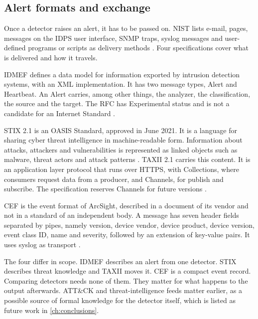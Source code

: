\subsection{Alert formats and exchange}
\label{sec:alert-formats}

Once a detector raises an alert, it has to be passed on. NIST lists e-mail,
pages, messages on the IDPS user interface, SNMP traps, syslog messages and
user-defined programs or scripts as delivery methods
\citep{scarfone2007nist80094}. Four specifications cover what is delivered
and how it travels.

IDMEF defines a data model for information exported by intrusion detection
systems, with an XML implementation. It has two message types, Alert and
Heartbeat. An Alert carries, among other things, the analyzer, the
classification, the source and the target. The RFC has Experimental status
and is not a candidate for an Internet Standard \citep{debar2007rfc4765}.

STIX 2.1 is an OASIS Standard, approved in June 2021. It is a language for
sharing cyber threat intelligence in machine-readable form. Information about
attacks, attackers and vulnerabilities is represented as linked objects such
as malware, threat actors and attack patterns \citep{jordan2021stix}.
TAXII 2.1 carries this content. It is an application layer protocol that runs
over HTTPS, with Collections, where consumers request data from a producer,
and Channels, for publish and subscribe. The specification reserves Channels
for future versions \citep{jordan2021taxii}.

CEF is the event format of ArcSight, described in a document of its
vendor and not in a standard of an independent body. A message has seven
header fields separated by pipes, namely version, device vendor, device
product, device version, event class ID, name and severity, followed by an
extension of key-value pairs. It uses syslog as transport
\citep{opentext2023cef}.

The four differ in scope. IDMEF describes an alert from one detector. STIX
describes threat knowledge and TAXII moves it. CEF is a compact event record.
Comparing detectors needs none of them. They matter for what happens to the
output afterwards. ATT\&CK and threat-intelligence feeds matter earlier, as a
possible source of formal knowledge for the detector itself, which is listed
as future work in \cref{ch:conclusions}.

